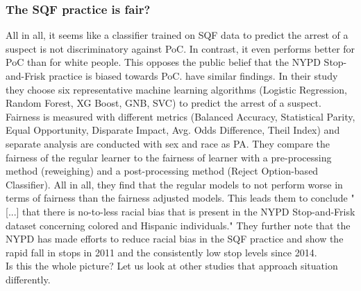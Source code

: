 \subsubsection*{The SQF practice is fair?}
All in all, it seems like a classifier trained on SQF data to predict the arrest of a suspect is not discriminatory against PoC. In contrast, it even performs better for PoC than for white people. This opposes the public belief that the NYPD Stop-and-Frisk practice is biased towards PoC. \cite{Badr2022DTFANSP} have similar findings.
In their study they choose six representative machine learning algorithms (Logistic Regression, Random Forest, XG Boost, GNB, SVC) to predict the arrest of a suspect. Fairness is measured with different metrics (Balanced Accuracy, Statistical Parity, Equal Opportunity, Disparate Impact, Avg. Odds Difference, Theil Index) and separate analysis are conducted with sex and race as PA.
They compare the fairness of the regular learner to the fairness of learner with a pre-processing method (reweighing) and a post-processing method (Reject Option-based Classifier). All in all, they find that the regular models to not perform worse in terms of fairness than the fairness adjusted models. This leads them to conclude "[...] that there is no-to-less racial bias that is present in the NYPD Stop-and-Frisk dataset concerning colored and Hispanic individuals."
They further note that the NYPD has made efforts to reduce racial bias in the SQF practice and show the rapid fall in stops in 2011 and the consistently low stop levels since 2014. \\
Is this the whole picture? Let us look at other studies that approach situation differently. \\




